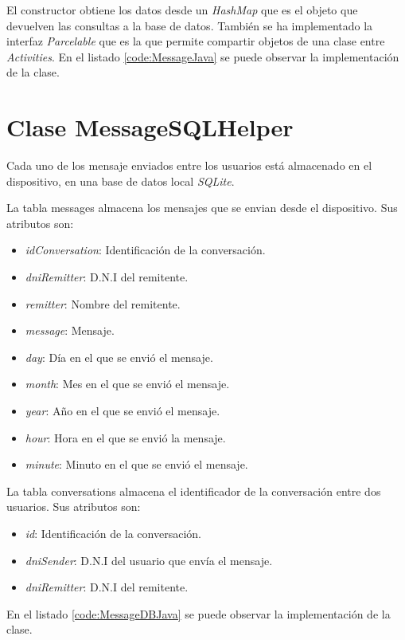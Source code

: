 		El constructor obtiene los datos desde un {\it HashMap}\cite{10:hashmap:online} que es el objeto que devuelven las consultas a la base de datos. También se ha implementado la interfaz {\it Parcelable}\cite{11:parcelable:online} que es la que permite compartir objetos de una clase entre {\it Activities}. 
		En el listado \ref{code:MessageJava} se puede observar la implementación de la clase.
		
		
		
	\section{Clase MessageSQLHelper}
		Cada uno de los mensaje enviados entre los usuarios está almacenado en el dispositivo, en una base de datos local {\it SQLite}\cite{13:sqlite:online}.
		
		\bigskip
		La tabla {\ttfamily messages} almacena los mensajes que se envian desde el dispositivo. Sus atributos son:
		
		\begin{itemize}
			\item {\it idConversation}: Identificación de la conversación.
			\item {\it dniRemitter}: D.N.I del remitente.
			\item {\it remitter}: Nombre del remitente.
			\item {\it message}: Mensaje. 
			\item {\it day}: Día en el que se envió el mensaje.
			\item {\it month}: Mes en el que se envió el mensaje.
			\item {\it year}: Año en el que se envió el mensaje.
			\item {\it hour}: Hora en el que se envió la mensaje.
			\item {\it minute}: Minuto en el que se envió el mensaje.
		\end{itemize}
		
		\bigskip
		La tabla {\ttfamily conversations} almacena el identificador de la conversación entre dos usuarios.
		Sus atributos son:
		
		\begin{itemize}
			\item {\it id}: Identificación de la conversación.
			\item {\it dniSender}: D.N.I del usuario que envía el mensaje.
			\item {\it dniRemitter}: D.N.I del remitente.
		\end{itemize}
		
		En el listado \ref{code:MessageDBJava} se puede observar la implementación de la clase.
		
		